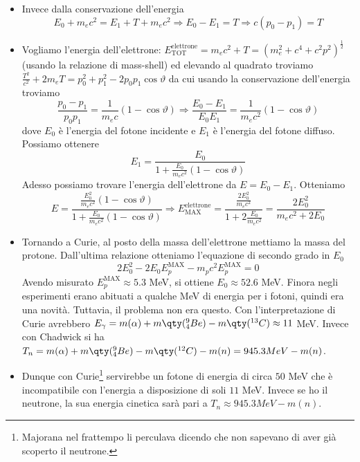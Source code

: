   \begin{itemize}
  \item Invece dalla conservazione dell'energia
  \begin{equation*}
      E_0+m_ec^2=E_1+T+m_ec^2\Rightarrow E_0-E_1=T\Rightarrow c(p_0-p_1)=T
  \end{equation*}
  \item Vogliamo l'energia dell'elettrone: $E_{\text{TOT}}^{\text{elettrone}}=m_ec^2+T=(m_e^2+c^4+c^2p^2)^{\frac12}$ (usando la relazione di mass-shell) ed elevando al quadrato troviamo $\frac{T^2}{c^2}+2m_eT=p_0^2+p_1^2-2p_0p_1\cos\vartheta$ da cui usando la conservazione dell'energia troviamo
  \begin{equation*}
    \frac{p_0-p_1}{p_0p_1}=\frac1{m_ec}(1-\cos\vartheta)\Rightarrow \frac{E_0-E_1}{E_0E_1}=\frac1{m_ec^2}(1-\cos\vartheta)
  \end{equation*}
  dove $E_0$ è l'energia del fotone incidente e $E_1$ è l'energia del fotone diffuso. Possiamo ottenere 
  \begin{equation*}
    E_1 = \frac{E_0}{1+\frac{E_0}{m_ec^2}(1-\cos\vartheta)}
  \end{equation*}
Adesso possiamo trovare l'energia dell'elettrone da $E=E_0-E_1$. Otteniamo
\begin{equation*}
    E=\frac{\frac{E_0^2}{m_ec^2}(1-\cos\vartheta)}{1+\frac{E_0}{m_ec^2}(1-\cos\vartheta)}\Rightarrow E_{\text{MAX}}^{\text{elettrone}}=\frac{\frac{2E_0^2}{m_ec^2}}{1+2\frac{E_0}{m_ec^2}}=\frac{2E_0^2}{m_ec^2+2E_0}
\end{equation*}
    \item Tornando a Curie, al posto della massa dell'elettrone mettiamo la massa del protone. Dall'ultima relazione otteniamo l'equazione di secondo grado in $E_0$
    \begin{equation*}
        2E_0^2-2E_0E_p^{\text{MAX}}-m_pc^2E_p^{\text{MAX}}=0
    \end{equation*}
    Avendo misurato $E_p^{\text{MAX}}\approx 5.3$ MeV, si ottiene $E_0\approx 52.6$ MeV. Finora negli esperimenti erano abituati a qualche MeV di energia per i fotoni, quindi era una novità. Tuttavia, il problema non era questo. Con l'interpretazione di Curie avrebbero $E_\gamma=m(\alpha)+m\qty(^9_4Be)-m\qty(^{13}C)\approx 11$ MeV. Invece con Chadwick si ha $T_n=m(\alpha)+m\qty(^9_4Be)-m\qty(^{12}C)- m(n)=945.3 MeV - m(n)$.
\item Dunque con Curie\footnote{Majorana nel frattempo li perculava dicendo che non sapevano di aver già scoperto il neutrone.} servirebbe un fotone di energia di circa $50$ MeV che è incompatibile con l'energia a disposizione di soli $11$ MeV. Invece se ho il neutrone, la sua energia cinetica sarà pari a $T_n\approx 945.3 MeV - m(n)$.
\end{itemize}
